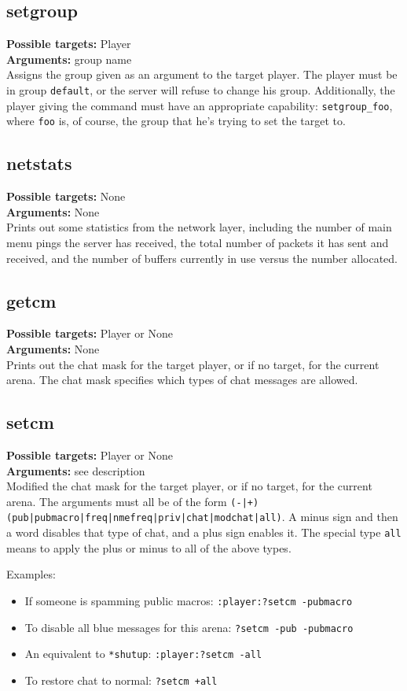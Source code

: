 \documentclass{article}
\newcommand{\targets}[1]{\noindent\textbf{Possible targets:} #1\\}
\newcommand{\args}[1]{\noindent\textbf{Arguments:} #1\\}
\begin{document}
\subsection{setgroup}
\targets{Player}
\args{group name}
Assigns the group given as an argument to the target player. The player
must be in group \verb/default/, or the server will refuse to change his
group. Additionally, the player giving the command must have an
appropriate capability: \verb/setgroup_foo/, where \verb/foo/ is, of
course, the group that he's trying to set the target to.

\subsection{netstats}
\targets{None}
\args{None}
Prints out some statistics from the network layer, including the number
of main menu pings the server has received, the total number of packets
it has sent and received, and the number of buffers currently in use
versus the number allocated.

\subsection{getcm}
\targets{Player or None}
\args{None}
Prints out the chat mask for the target player, or if no target, for the
current arena. The chat mask specifies which types of chat messages are
allowed.

\subsection{setcm}
\targets{Player or None}
\args{see description}
Modified the chat mask for the target player, or if no target, for the
current arena. The arguments must all be of the form
\texttt{(-|+)(pub|pubmacro|freq|nmefreq|priv|chat|modchat|all)}. A minus
sign and then a word disables that type of chat, and a plus sign enables
it. The special type \texttt{all} means to apply the plus or minus to
all of the above types.

Examples:
\begin{itemize}
\item If someone is spamming public macros: \verb/:player:?setcm -pubmacro/
\item To disable all blue messages for this arena: \verb/?setcm -pub -pubmacro/
\item An equivalent to \verb/*shutup/: \verb/:player:?setcm -all/
\item To restore chat to normal: \verb/?setcm +all/
\end{itemize}
\end{document}
